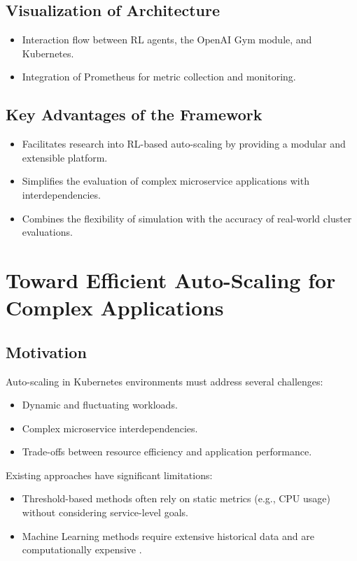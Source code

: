 \documentclass[conference]{IEEEtran}
\begin{document}
\subsection{Visualization of Architecture}
\begin{itemize}
    \item Interaction flow between RL agents, the OpenAI Gym module, and Kubernetes.
    \item Integration of Prometheus for metric collection and monitoring.
\end{itemize}

\subsection{Key Advantages of the Framework}
\begin{itemize}
    \item Facilitates research into RL-based auto-scaling by providing a modular and extensible platform.
    \item Simplifies the evaluation of complex microservice applications with interdependencies.
    \item Combines the flexibility of simulation with the accuracy of real-world cluster evaluations.
\end{itemize}


\section{Toward Efficient Auto-Scaling for Complex Applications}
\label{sec:efficient_auto_scaling}

\subsection{Motivation}
Auto-scaling in Kubernetes environments must address several challenges:
\begin{itemize}
    \item Dynamic and fluctuating workloads.
    \item Complex microservice interdependencies.
    \item Trade-offs between resource efficiency and application performance.
\end{itemize}

Existing approaches have significant limitations:
\begin{itemize}
    \item Threshold-based methods often rely on static metrics (e.g., CPU usage) without considering service-level goals.
    \item Machine Learning methods require extensive historical data and are computationally expensive \cite{rossi2019horizontal}.
\end{itemize}
\end{document}
